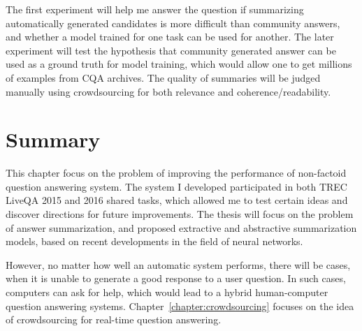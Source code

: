 The first experiment will help me answer the question if summarizing automatically generated candidates is more difficult than community answers, and whether a model trained for one task can be used for another.
The later experiment will test the hypothesis that community generated answer can be used as a ground truth for model training, which would allow one to get millions of examples from CQA archives.
The quality of summaries will be judged manually using crowdsourcing for both relevance and coherence/readability.

\section{Summary}
\label{section:non-factoid:summary}

This chapter focus on the problem of improving the performance of non-factoid question answering system.
The system I developed participated in both TREC LiveQA 2015 and 2016 shared tasks, which allowed me to test certain ideas and discover directions for future improvements.
The thesis will focus on the problem of answer summarization, and proposed extractive and abstractive summarization models, based on recent developments in the field of neural networks.

However, no matter how well an automatic system performs, there will be cases, when it is unable to generate a good response to a user question.
In such cases, computers can ask for help, which would lead to a hybrid human-computer question answering systems.
Chapter~\ref{chapter:crowdsourcing} focuses on the idea of crowdsourcing for real-time question answering.
